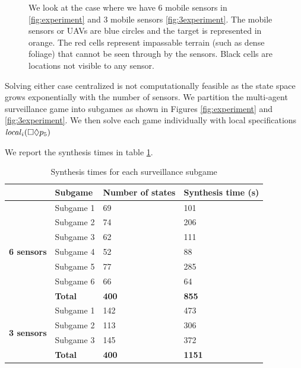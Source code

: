 \begin{figure}
{\hspace{.3cm}}

\caption{We look at the case where we have 6 mobile sensors in \ref{fig:experiment} and 3 mobile sensors \ref{fig:3experiment}\label{fig:bigexp}. The mobile sensors or UAVs are blue circles and the target is represented in orange. The red cells represent impassable terrain (such as dense foliage) that cannot be seen through by the sensors. Black cells are locations not visible to any sensor.}\vspace{-0.5cm}
\end{figure} 

Solving either case centralized is not computationally feasible as the state space grows exponentially with the number of sensors. We partition the multi-agent surveillance game into subgames as shown in Figures \ref{fig:experiment} and \ref{fig:3experiment}. We then solve each game individually with local specifications $\mathit{local}_i(\square \lozenge p_5)$

We report the synthesis times in table \ref{tab:synthtime}.

\begin{table}[h!]
	\centering
	\caption{Synthesis times for each surveillance subgame}
	\label{tab:synthtime}
	\begin{tabular}{c|l|l|l}
		\multicolumn{1}{l|}{}                                    & \textbf{Subgame} & \textbf{Number of states} & \textbf{Synthesis time (s)} \\ \hline \hline
		\multirow{7}{*}{\textbf{6 sensors}}
		& Subgame 1   & 69     & 101                          \\
	    & Subgame 2   & 74     & 206                          \\
		& Subgame 3   & 62     & 111                          \\
		& Subgame 4   & 52     & 88                          \\
		& Subgame 5   & 77     & 285                          \\
		& Subgame 6   & 66     & 64                          \\ \hline
		& \textbf{Total}   & \textbf{400}         & \textbf{855}                         \\ \hline
		\multicolumn{1}{l|}{\multirow{4}{*}{\textbf{3 sensors}}} & Subgame 1        & 142 & 473                         \\
		\multicolumn{1}{l|}{}                                    & Subgame 2        & 113 & 306                         \\
		\multicolumn{1}{l|}{}                                    & Subgame 3        & 145 & 372                         \\ \hline
		\multicolumn{1}{l|}{}                                    &  \textbf{Total} & \textbf{400}            & \textbf{1151}                        
	\end{tabular}
\end{table}


